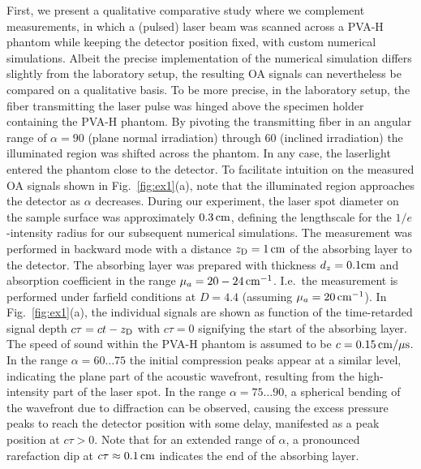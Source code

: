 \documentclass[12pt]{iopart}
\begin{document}
First, we present a qualitative comparative study where we complement 
measurements, in which a (pulsed) laser beam was scanned across a PVA-H phantom while
keeping the detector position fixed, with custom numerical simulations. 
Albeit the precise implementation of the numerical simulation differs slightly
from the laboratory setup, the resulting OA signals can nevertheless be compared
on a qualitative basis.
To be more precise, in the laboratory setup, the fiber transmitting the laser
pulse was hinged above the specimen holder containing the PVA-H phantom. By
pivoting the transmitting fiber in an angular range of $\alpha = 90$ (plane
normal irradiation) through $60$ (inclined irradiation) the illuminated region
was shifted across the phantom. In any case, the laserlight entered
the phantom close to the detector. To facilitate intuition on the measured OA
signals shown in Fig.\ \ref{fig:ex1}(a), note that the illuminated region
approaches the detector as $\alpha$ decreases.
During our experiment, the laser spot diameter on the sample surface was
approximately $0.3\,{\rm cm}$, defining the lengthscale for the
$1/e$-intensity radius for our subsequent numerical simulations. The
measurement was performed in backward mode with a distance $z_{\rm
D}=1\,{\rm{cm}}$ of the absorbing layer to the detector.  The absorbing layer
was prepared with thickness $d_z=0.1{\rm{cm}}$ and absorption coefficient in
the range $\mu_a= 20-24\,{\rm cm}^{-1}$.  I.e.\ the measurement is performed
under farfield conditions at $D=4.4$ (assuming $\mu_a=20\,{\rm{cm}}^{-1}$).  In
Fig.\ \ref{fig:ex1}(a), the individual signals are shown as function of the
time-retarded signal depth $c \tau = c t - z_{\rm D}$ with $c
\tau=0$ signifying the start of the absorbing layer. The speed of sound within
the PVA-H phantom is assumed to be $c=0.15\,{\rm{cm/\mu s}}$.
In the range $\alpha= 60 \ldots 75$ the initial compression peaks appear at a
similar level, indicating the plane part of the acoustic wavefront, resulting
from the high-intensity part of the laser spot.  In the range $\alpha=75 \ldots
90$, a spherical bending of the wavefront due to diffraction can be observed,
causing the excess pressure peaks to reach the detector position with some
delay, manifested as a peak position at $c \tau > 0$.
Note that for an extended range of $\alpha$, a pronounced rarefaction dip at 
$c \tau \approx 0.1\,{\rm{cm}}$ indicates the end of the absorbing layer.
\end{document}
